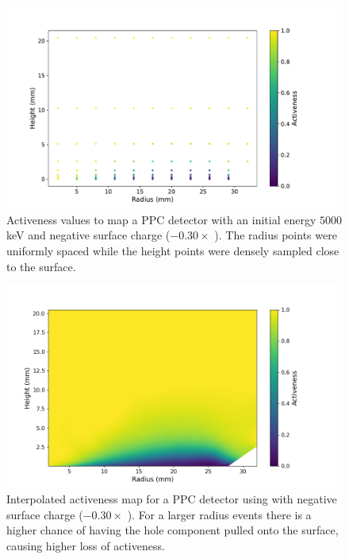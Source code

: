 \begin{figure}%
\includegraphics[trim={0cm 0.5cm 3.2cm 1.15cm},clip,width=0.95\linewidth]{ch5/figs/activenss_map_ponama_1_-0.3_5000.pdf}
\caption{Activeness values to map a PPC detector \ehd with an initial energy $5000$ keV and negative surface charge ($-0.30 \times$ {\scunit}). The radius points were uniformly spaced while the height points were densely sampled close to the surface.}
\label{ch5_fig_activeness_points_neg}
\end{figure}

\begin{figure}%
\centering
\includegraphics[trim={1.0cm 0.5cm 3.2cm 1.5cm},clip,width=0.95\linewidth]{ch5/figs/activeness_map_cubic_sc=-0.3_ponama_1_5000_linear_full.png}
\caption{Interpolated activeness map for a PPC detector using \ehd with negative surface charge ($-0.30 \times$ {\scunit}). For a larger radius events there is a higher chance of having the hole component pulled onto the surface, causing higher loss of activeness.}
\label{ch5_fig_activeness_map_neg}
\end{figure}

